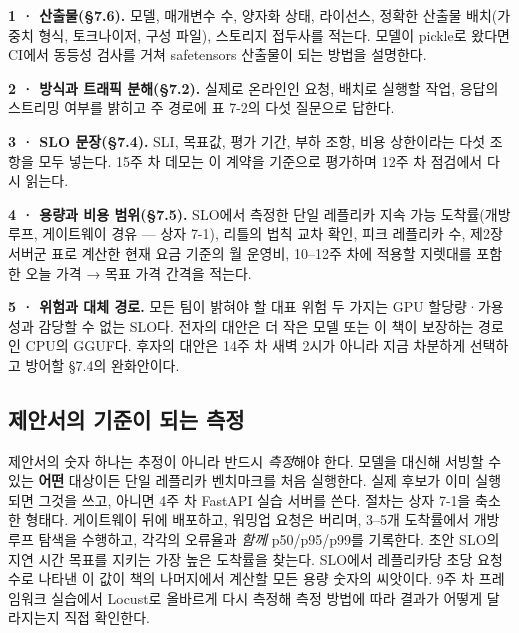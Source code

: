 \begin{tbbitemize}
  \item \textbf{1 · 산출물(§7.6).} 모델, 매개변수 수, 양자화 상태, 라이선스, 정확한 산출물 배치(가중치 형식, 토크나이저, 구성 파일), 스토리지 접두사를 적는다. 모델이 pickle로 왔다면 CI에서 동등성 검사를 거쳐 safetensors 산출물이 되는 방법을 설명한다.
  \item \textbf{2 · 방식과 트래픽 분해(§7.2).} 실제로 온라인인 요청, 배치로 실행할 작업, 응답의 스트리밍 여부를 밝히고 주 경로에 표 7-2의 다섯 질문으로 답한다.
  \item \textbf{3 · SLO 문장(§7.4).} SLI, 목표값, 평가 기간, 부하 조항, 비용 상한이라는 다섯 조항을 모두 넣는다. 15주 차 데모는 이 계약을 기준으로 평가하며 12주 차 점검에서 다시 읽는다.
  \item \textbf{4 · 용량과 비용 범위(§7.5).} SLO에서 측정한 단일 레플리카 지속 가능 도착률(개방 루프, 게이트웨이 경유 — 상자 7-1), 리틀의 법칙 교차 확인, 피크 레플리카 수, 제2장 서버군 표로 계산한 현재 요금 기준의 월 운영비, 10–12주 차에 적용할 지렛대를 포함한 오늘 가격 → 목표 가격 간격을 적는다.
  \item \textbf{5 · 위험과 대체 경로.} 모든 팀이 밝혀야 할 대표 위험 두 가지는 GPU 할당량·가용성과 감당할 수 없는 SLO다. 전자의 대안은 더 작은 모델 또는 이 책이 보장하는 경로인 CPU의 GGUF다. 후자의 대안은 14주 차 새벽 2시가 아니라 지금 차분하게 선택하고 방어할 §7.4의 완화안이다.
\end{tbbitemize}

\subsection*{제안서의 기준이 되는 측정}

제안서의 숫자 하나는 추정이 아니라 반드시 \textit{측정}해야 한다. 모델을 대신해 서빙할 수 있는 \textbf{어떤} 대상이든 단일 레플리카 벤치마크를 처음 실행한다. 실제 후보가 이미 실행되면 그것을 쓰고, 아니면 4주 차 FastAPI 실습 서버를 쓴다. 절차는 상자 7-1을 축소한 형태다. 게이트웨이 뒤에 배포하고, 워밍업 요청은 버리며, 3–5개 도착률에서 개방 루프 탐색을 수행하고, 각각의 오류율과 \textit{함께} p50/p95/p99를 기록한다. 초안 SLO의 지연 시간 목표를 지키는 가장 높은 도착률을 찾는다. SLO에서 레플리카당 초당 요청 수로 나타낸 이 값이 책의 나머지에서 계산할 모든 용량 숫자의 씨앗이다. 9주 차 프레임워크 실습에서 Locust로 올바르게 다시 측정해 측정 방법에 따라 결과가 어떻게 달라지는지 직접 확인한다.

